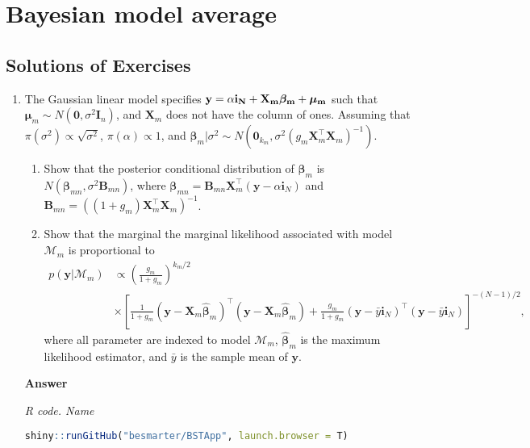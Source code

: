 \chapter{Bayesian model average}\label{chap10}

\section{Solutions of Exercises}\label{sec101}
\begin{enumerate}[leftmargin=*]

		\item The Gaussian linear model specifies $\bf{y}=\alpha\bm{i}_N+\bm{X}_m\bm{\beta}_m+\bm{\mu}_m$ such that $\bm{\mu}_m\sim{N}(\bm{0},\sigma^2\bm{I}_n)$, and $\bm{X}_m$ does not have the column of ones. Assuming that $\pi(\sigma^2)\propto \sqrt{\sigma^2}$, $\pi(\alpha)\propto 1$, and $\bm{\beta}_m|\sigma^2 \sim {N}(\bm{0}_{k_m}, \sigma^2 (g_m\bm{X}_m^{\top}\bm{X}_m)^{-1})$.
	\begin{enumerate}
		\item Show that the posterior conditional distribution of $\bm{\beta}_m$ is $N(\bm{\beta}_{mn},\sigma^2\bm{B}_{mn})$, where $\bm{\beta}_{mn}=\bm{B}_{mn}\bm{X}_m^{\top}(\bm{y}-\alpha\bm{i}_N)$ and $\bm{B}_{mn}=((1+g_m)\bm{X}_m^{\top}\bm{X}_m)^{-1}$.
		\item Show that the marginal the marginal likelihood associated with model $\mathcal{M}_m$ is proportional to
		\begin{align*}
			p(\bm{y}|\mathcal{M}_m)&\propto \left(\frac{g_m}{1+g_m}\right)^{k_m/2}\\
			&\times \left[\frac{1}{1+g_m}(\bm{y}-\bm{X}_m\hat{\bm{\beta}}_m)^{\top}(\bm{y}-\bm{X}_m\hat{\bm{\beta}}_m)+\frac{g_m}{1+g_m}(\bm{y}-\bar{y}\bm{i}_N)^{\top}(\bm{y}-\bar{y}\bm{i}_N)\right]^{-(N-1)/2},
		\end{align*}
		where all parameter are indexed to model $\mathcal{M}_m$, $\hat{\bm{\beta}}_m$ is the maximum likelihood estimator, and $\bar{y}$ is the sample mean of $\bm{y}$.   
	\end{enumerate}  
	
	\textbf{Answer}
	
	\begin{tcolorbox}[enhanced,width=4.67in,center upper,
		fontupper=\large\bfseries,drop shadow southwest,sharp corners]
		\textit{R code. Name}
		\begin{VF}
			\begin{lstlisting}[language=R]
	shiny::runGitHub("besmarter/BSTApp", launch.browser = T)
\end{lstlisting}
		\end{VF}
	\end{tcolorbox} 
	
\end{enumerate}